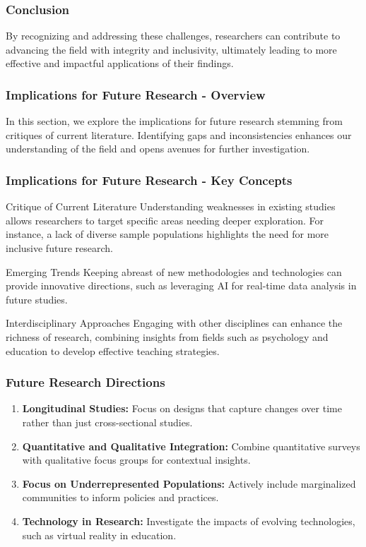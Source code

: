 \documentclass[aspectratio=169]{beamer}
\begin{document}
\begin{frame}[fragile]
    \frametitle{Conclusion}
    By recognizing and addressing these challenges, researchers can contribute to advancing the field with integrity and inclusivity, ultimately leading to more effective and impactful applications of their findings.
\end{frame}

\begin{frame}[fragile]
    \frametitle{Implications for Future Research - Overview}
    In this section, we explore the implications for future research stemming from critiques of current literature. Identifying gaps and inconsistencies enhances our understanding of the field and opens avenues for further investigation. 
\end{frame}

\begin{frame}[fragile]
    \frametitle{Implications for Future Research - Key Concepts}
    \begin{block}{Critique of Current Literature}
        Understanding weaknesses in existing studies allows researchers to target specific areas needing deeper exploration. For instance, a lack of diverse sample populations highlights the need for more inclusive future research.
    \end{block}
    
    \begin{block}{Emerging Trends}
        Keeping abreast of new methodologies and technologies can provide innovative directions, such as leveraging AI for real-time data analysis in future studies.
    \end{block}
    
    \begin{block}{Interdisciplinary Approaches}
        Engaging with other disciplines can enhance the richness of research, combining insights from fields such as psychology and education to develop effective teaching strategies.
    \end{block}
\end{frame}

\begin{frame}[fragile]
    \frametitle{Future Research Directions}
    \begin{enumerate}
        \item \textbf{Longitudinal Studies:} Focus on designs that capture changes over time rather than just cross-sectional studies.
        \item \textbf{Quantitative and Qualitative Integration:} Combine quantitative surveys with qualitative focus groups for contextual insights.
        \item \textbf{Focus on Underrepresented Populations:} Actively include marginalized communities to inform policies and practices.
        \item \textbf{Technology in Research:} Investigate the impacts of evolving technologies, such as virtual reality in education.
    \end{enumerate}
\end{frame}
\end{document}
